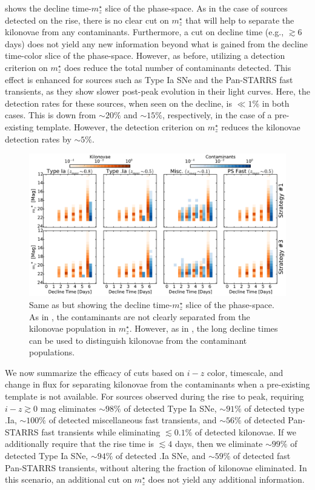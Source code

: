 shows the decline time-$m^{\star}_z$ slice of the phase-space. As in the case of sources detected on the rise, there is no clear cut on $m^{\star}_z$ that will help to separate the kilonovae from any contaminants. Furthermore, a cut on decline time (e.g., $\gtrsim 6$ days) does not yield any new information beyond what is gained from the decline time-color slice of the phase-space. However, as before, utilizing a detection criterion on $m^{\star}_z$ does reduce the total number of contaminants detected. This effect is enhanced for sources such as Type Ia SNe and the Pan-STARRS fast transients, as they show slower post-peak evolution in their light curves. Here, the detection rates for these sources, when seen on the decline, is $\ll1\%$ in both cases. This is down from $\sim20\%$ and $\sim15\%$, respectively, in the case of a pre-existing template. However, the detection criterion on $m^{\star}_z$ reduces the kilonovae detection rates by $\sim5\%$. 

\begin{figure}[t!]
\centering
\includegraphics[width=\textwidth]{./figs/chapter2/f17.pdf}
\caption{\singlespace Same as  but showing the decline time-$m^{\star}_z$ slice of the phase-space. As in , the contaminants are not clearly separated from the kilonovae population in $m^{\star}_z$. However, as in , the long decline times can be used to distinguish kilonovae from the contaminant populations.}
\label{fig:ch2_phasedecdiff_df}
\end{figure}

\clearpage
We now summarize the efficacy of cuts based on $i-z$ color, timescale, and change in flux for separating kilonovae from the contaminants when a pre-existing template is not available. For sources observed during the rise to peak, requiring $i-z\gtrsim0$ mag eliminates $\sim98\%$ of detected Type Ia SNe, $\sim91\%$ of detected type .Ia, $\sim100\%$ of detected miscellaneous fast transients, and $\sim 56\%$ of detected Pan-STARRS fast transients while eliminating $\lesssim0.1\%$ of detected kilonovae. If we additionally require that the rise time is $\lesssim4$ days, then we eliminate $\sim99\%$ of detected Type Ia SNe, $\sim94\%$ of detected .Ia SNe, and $\sim59\%$ of detected fast Pan-STARRS transients, without altering the fraction of kilonovae eliminated. In this scenario, an additional cut on $m^{\star}_z$ does not yield any additional information.

